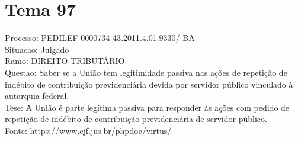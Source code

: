 \documentclass[12pt]{article}
\begin{document}
\section*{Tema 97}
Processo: PEDILEF 0000734-43.2011.4.01.9330/ BA\\
Situacao: Julgado\\
Ramo: DIREITO TRIBUTÁRIO\\
Questao: Saber se a União tem legitimidade passiva nas ações de repetição de indébito de contribuição previdenciária devida por servidor público vinculado à autarquia federal.\\
Tese: A União é parte legítima passiva para responder às ações com pedido de repetição de indébito de contribuição previdenciária de servidor público.\\
Fonte: https://www.cjf.jus.br/phpdoc/virtus/
\end{document}
